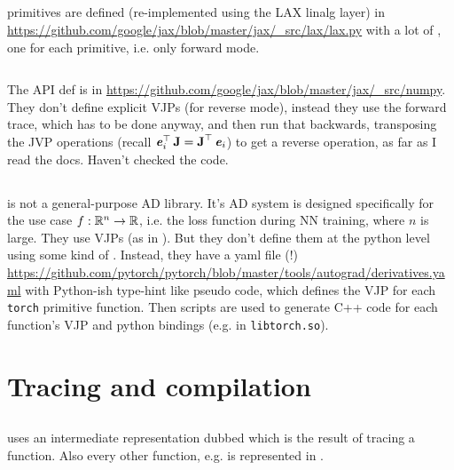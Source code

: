 \documentclass[paper=a4,11pt,headsepline]{scrartcl}
\begin{document}
\subsection{\jax}

\numpy primitives are defined (re-implemented using the LAX linalg layer) in
\url{https://github.com/google/jax/blob/master/jax/_src/lax/lax.py} with a lot of
, one for each primitive, i.e. only forward mode.

\inputminted{python}{../talk/code/jax_lax_sin.py}

The \numpy API def is in
\url{https://github.com/google/jax/blob/master/jax/_src/numpy}. They don't
define explicit VJPs (for reverse mode), instead they use the forward trace,
which has to be done anyway, and then run that backwards, transposing the JVP
operations (recall $\bm{\mathit{e}}_i^\top\,\bm{\mathbf{J}} = \bm{\mathbf{J}}^\top\,\bm{\mathit{e}}_i$) to get a
reverse operation, as far as I read the docs. Haven't checked the code.

\subsection{\pytorch}

\pytorch is not a general-purpose AD library. It's AD system is designed
specifically for the use case $f: \mathbb R^n\rightarrow\mathbb R$, i.e. the loss
function during NN training, where $n$ is large. They use VJPs (as in
\autograd). But they don't define them at the python level using some kind of
. Instead, they have a yaml file (!)
\url{https://github.com/pytorch/pytorch/blob/master/tools/autograd/derivatives.yaml}
with Python-ish type-hint like pseudo code, which defines the VJP for each
\texttt{torch} primitive function. Then scripts are used to generate C++ code
for each function's VJP and python bindings (e.g. in \texttt{libtorch.so}).


\section{Tracing and compilation}

\subsection{\jax}

\jax uses an intermediate representation
dubbed  which is the result of tracing a function. Also every
other function, e.g.  is represented in .
\end{document}
